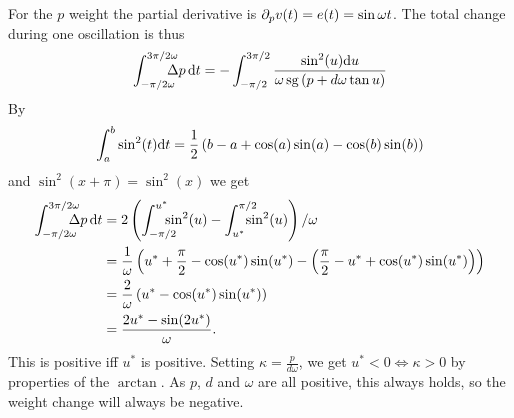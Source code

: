 \documentclass{article}
\begin{document}
    For the $p$ weight the partial derivative is $\partial_{p}v(t) = e(t) = \sin \omega t$. The total change during one oscillation is thus
    \begin{align}
        \int_{-\pi/2\omega}^{3\pi/2\omega} \hspace{-1em}\Delta p \, \mathrm{d}t &=  -\int_{-\pi/2}^{3\pi/2} \frac{ \sin^2(u) \mathrm{d}u }{\omega \operatorname{sg} \left(p + d \omega \tan{u}\right) }\\
    \end{align}
    By 
    \begin{align}
        \int_{a}^{b} \sin^2(t) \mathrm{d}t = \frac{1}{2} \left(b - a + \cos(a) \sin(a) - \cos(b) \sin(b) \right)
    \end{align}
    and $\sin^2(x + \pi) = \sin^2(x)$ we get
    \begin{align}
        \int_{-\pi/2\omega}^{3\pi/2\omega} \hspace{-1em}\Delta p \, \dt
        &= 2 \left(\int_{-\pi/2}^{u^*} \hspace{-1em} \sin^2(u) - \int_{u^*}^{\pi/2} \hspace{-1em} \sin^2(u) \right) / \omega \\
        &= \frac{1}{\omega} \left( u^* + \pihalf - \cos(u^*) \sin(u^*) - \left( \pihalf - u^* + \cos(u^*) \sin(u^*) \right)\right) \nonumber \\
        &= \frac{2}{\omega} \left(u^* - \cos(u^*) \sin(u^*) \right) \nonumber \\
        &= \frac{2 u^* - \sin(2 u^*)}{\omega}.
    \end{align}
    This is positive iff $u^*$ is positive. Setting $\kappa = \frac{p}{d \omega}$, we get $u^* < 0 \Leftrightarrow \kappa > 0$ by properties of the $\arctan$. As $p$, $d$ and $\omega$ are all positive, this always holds, so the weight change will always be negative.
\end{document}
